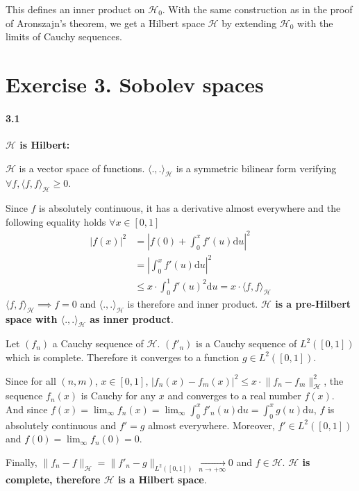 \documentclass[10pt]{article}
\begin{document}
    This defines an inner product on $\mathcal{H}_0$. With the same 
    construction as in the proof of Aronszajn's theorem, we get a Hilbert space
    $\mathcal{H}$ by extending $\mathcal{H}_0$ with the limits of Cauchy 
    sequences.

    \section*{Exercise 3. Sobolev spaces}
    \paragraph{3.1} \textbf{ $\mathcal{H}$ is Hilbert: }
    
    $\mathcal{H}$ is a vector space of functions. $\langle ., .
    \rangle_\mathcal{H}$ is a symmetric bilinear form verifying $\forall f, 
    \langle f, f \rangle_\mathcal{H} \geq 0$.
    
    Since $f$ is absolutely continuous, it has a derivative almost everywhere 
    and the following equality holds $\forall x \in [0, 1]$
    \begin{align*}
        |f(x)|^2 &= \left| f(0) + \int_0^x f'(u)\text{d}u \right|^2\\
        &= \left| \int_0^x f'(u)\text{d}u \right|^2 \tag{$f(0) = 0$}\\ 
        &\leq x\cdot\int_0^1 f'(u)^2\text{d}u = x \cdot
        \langle f, f \rangle_\mathcal{H}
    \end{align*}
    $\langle f, f \rangle_\mathcal{H} \implies f = 0$ and $\langle ., .
    \rangle_\mathcal{H}$ is therefore and inner product. \textbf{$\mathcal{H}$
    is a pre-Hilbert space with $\langle ., . \rangle_\mathcal{H}$ as inner 
    product}.

    Let $(f_n)$ a Cauchy sequence of $\mathcal{H}$. $(f'_n)$ is a Cauchy 
    sequence of  $L^2([0,1])$ which is complete. Therefore it converges to a 
    function $g \in L^2([0,1])$.

    Since for all $(n,m)$, $x \in [0, 1]$, 
    $|f_n(x) - f_m(x)|^2\leq x \cdot \lVert f_n - f_m \rVert_\mathcal{H}^2$, the
    sequence $f_n(x)$ is Cauchy for any $x$ and converges to a real number 
    $f(x)$. 
    And since $f(x) = \lim_\infty f_n(x) = \lim_\infty \int_0^xf'_n(u)\text{d}u
    =  \int_0^x g(u)\text{d}u$, $f$ is absolutely continuous and $f' = g$ almost
    everywhere. Moreover, $f'\in L^2([0, 1])$ and $f(0) = \lim_\infty f_n(0) 
    = 0$. 
     
    Finally, $\lVert f_n - f \rVert_\mathcal{H} = \lVert f'_n - g 
    \rVert_{L^2([0,1])} \xrightarrow[n \rightarrow +\infty]{} 0$ and $f\in 
    \mathcal{H}$. \textbf{$\mathcal{H}$ is complete, therefore $\mathcal{H}$ is 
    a Hilbert space}.
    \vspace{1cm}
\end{document}

